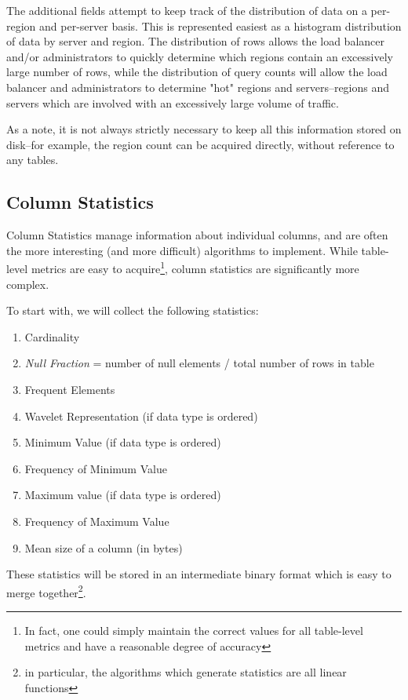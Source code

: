The additional fields attempt to keep track of the distribution of data on a per-region and per-server basis. This is represented easiest as a histogram distribution of data by server and region. The distribution of rows allows the load balancer and/or administrators to quickly determine which regions contain an excessively large number of rows, while the distribution of query counts will allow the load balancer and administrators to determine "hot" regions and servers--regions and servers which are involved with an excessively large volume of traffic.

As a note, it is not always strictly necessary to keep all this information stored on disk--for example, the region count can be acquired directly, without reference to any tables.

\subsection{Column Statistics}
Column Statistics manage information about individual columns, and are often the more interesting (and more difficult) algorithms to implement. While table-level metrics are easy to acquire\footnote{In fact, one could simply maintain the correct values for all table-level metrics and have a reasonable degree of accuracy}, column statistics are significantly more complex. 

To start with, we will collect the following statistics:

\begin{enumerate}
				\item Cardinality
				\item \emph{Null Fraction} = number of null elements / total number of rows in table
				\item Frequent Elements
				\item Wavelet Representation (if data type is ordered)
				\item Minimum Value (if data type is ordered)
				\item Frequency of Minimum Value
				\item Maximum value (if data type is ordered)
				\item Frequency of Maximum Value
				\item Mean size of a column (in bytes)
\end{enumerate}

These statistics will be stored in an intermediate binary format which is easy to merge together\footnote{in particular, the algorithms which generate statistics are all linear functions}.

